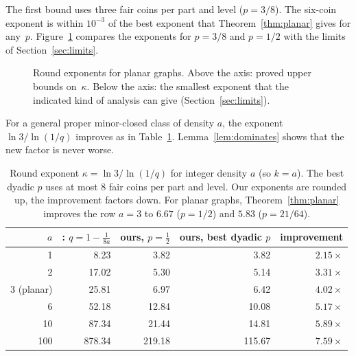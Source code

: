 \documentclass[11pt]{article}
\theoremstyle{remark}
\begin{document}
The first bound uses three fair coins per part and level ($p=3/8$). The six-coin exponent is within
$10^{-3}$ of the best exponent that Theorem~\ref{thm:planar} gives for any~$p$.
Figure~\ref{fig:exponents} compares the exponents for $p=3/8$ and $p=1/2$ with the limits of
Section~\ref{sec:limits}.

\begin{figure}[t]\centering

\caption{Round exponents for planar graphs. Above the axis: proved upper bounds on~$\kappa$. Below
the axis: the smallest exponent that the indicated kind of analysis can give
(Section~\ref{sec:limits}).}
\label{fig:exponents}
\end{figure}

For a general proper minor-closed class of density $a$, the exponent $\ln 3/\ln(1/q)$ improves
as in Table~\ref{tab:general}. Lemma~\ref{lem:dominates} shows that the new factor is never worse.

\begin{table}[ht]\centering
\begin{tabular}{rrrrr}\toprule
$a$ & \cite{AS26}: $q=1-\frac1{8a}$ & ours, $p=\frac12$ & ours, best dyadic $p$ & improvement\\\midrule
1 & 8.23 & 3.82 & 3.82 & $2.15\times$\\
2 & 17.02 & 5.30 & 5.14 & $3.31\times$\\
3 (planar) & 25.81 & 6.97 & 6.42 & $4.02\times$\\
6 & 52.18 & 12.84 & 10.08 & $5.17\times$\\
10 & 87.34 & 21.44 & 14.81 & $5.89\times$\\
100 & 878.34 & 219.18 & 115.67 & $7.59\times$\\\bottomrule
\end{tabular}
\caption{Round exponent $\kappa=\ln3/\ln(1/q)$ for integer density $a$ (so $k=a$).
The best dyadic $p$ uses at most $8$ fair coins per part and level. Our exponents are rounded up,
the improvement factors down. For planar graphs,
Theorem~\ref{thm:planar} improves the row $a=3$ to $6.67$ ($p=1/2$) and $5.83$ ($p=21/64$).}
\label{tab:general}
\end{table}
\end{document}

